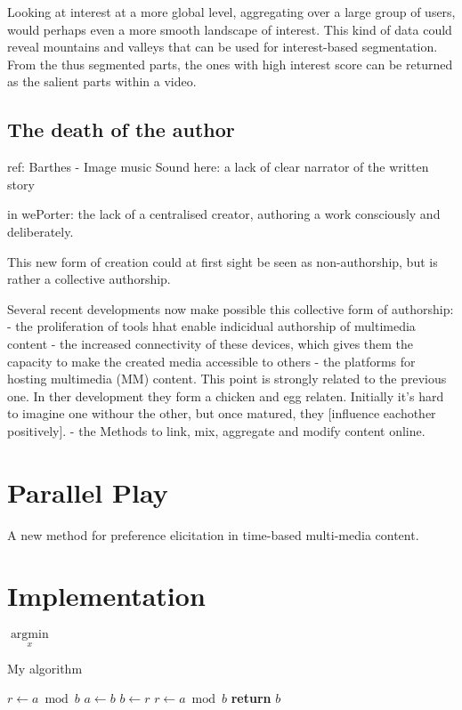 Looking at interest at a more global level, aggregating over a large group of users, would perhaps even a more smooth landscape of interest. This kind of data could reveal mountains and valleys that can be used for interest-based segmentation. From the thus segmented parts, the ones with high interest score can be returned as the salient parts within a video.

\subsection{The death of the author}
ref: Barthes - Image music Sound
here: a lack of clear narrator of the written story

in wePorter: the lack of a centralised creator, authoring a work consciously and deliberately.

This new form of creation could at first sight be seen as non-authorship, but is rather a collective authorship. 

Several recent developments now make possible this collective form of authorship:
- the proliferation of tools hhat enable indicidual authorship of multimedia content
- the increased connectivity of these devices, which gives them the capacity to make the created media accessible to others
- the platforms for hosting multimedia (MM) content. This point is strongly related to the previous one. In ther development they form a chicken and egg relaten. Initially it's hard to imagine one withour the other, but once matured, they [influence eachother positively].
- the Methods to link, mix, aggregate and modify content online.

\section{Parallel Play}
A new method for preference elicitation in time-based multi-media content.

\section{Implementation}
\label{sec:implementation}

$\underset{x}{\operatorname{argmin}}$

\begin{algorithm}
  \caption{My algorithm}
  \begin{algorithmic}[1]
      \State $r\gets a\bmod b$
        \State $a\gets b$
        \State $b\gets r$
        \State $r\gets a\bmod b$
      \EndWhile\label{euclidendwhile}
      \State \textbf{return} $b$
    \EndProcedure

  \end{algorithmic}
\end{algorithm}

